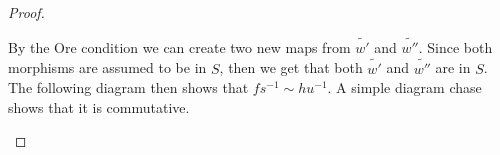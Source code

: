 \documentclass[11pt]{article}
\theoremstyle{definition}
\theoremstyle{remark}
\begin{document}
\begin{proof}
\begin{itemize}
\begin{center}
                    \end{center}
                    By the Ore condition we can create two new maps from $\widetilde{w'}$ and $\widetilde{w''}$. Since both morphisms are assumed to be in $S$, then we get that both $\widetilde{w'}$ and $\widetilde{w''}$ are in $S$. The following diagram then shows that $fs^{-1}\sim hu^{-1}$. A simple diagram chase shows that it is commutative.
                    \begin{center}
                    \end{center}
                \end{itemize}
            \end{proof}
\end{document}

